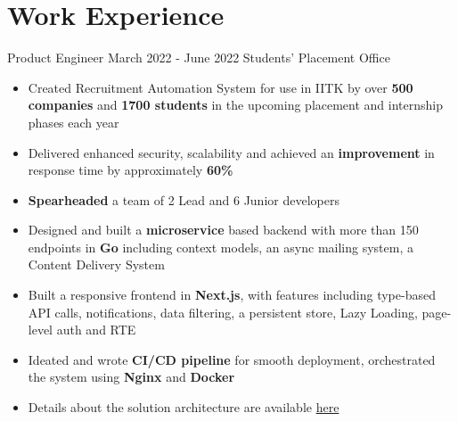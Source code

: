\section*{\sc Work Experience}
\vspace{-2mm}
\hrulefill
\vspace{1mm}

\excventry
{Product Engineer}
{March 2022 - June 2022}
{Students' Placement Office}
{
  \begin{itemize}
    \item Created Recruitment Automation System for use in IITK by over \textbf{500 companies} and \textbf{1700 students} in the upcoming placement and internship phases each year  
    \item Delivered enhanced security, scalability and achieved an \textbf{improvement} in response time by approximately \textbf{60\%}
    \item \textbf{Spearheaded} a team of 2 Lead and 6 Junior developers
    \item Designed and built a \textbf{microservice} based backend with more than 150 endpoints in \textbf{Go} including context models, an async mailing system, a Content Delivery System  
    \item Built a responsive frontend in \textbf{Next.js}, with features including type-based API calls, notifications, data filtering, a persistent store, Lazy Loading, page-level auth and RTE
    \item Ideated and wrote \textbf{CI/CD pipeline} for smooth deployment, orchestrated the system using \textbf{Nginx} and \textbf{Docker}
    \item Details about the solution architecture are available \href{https://abhishekshree.xyz/blog/engineering-ras}{here {\small \faExternalLink{}}}
  \end{itemize}
}


